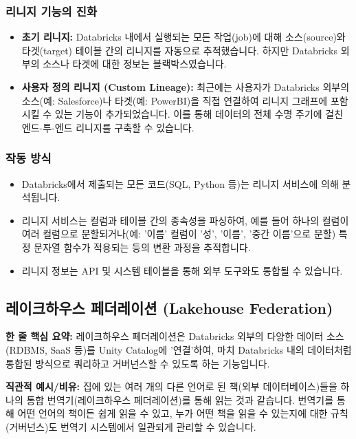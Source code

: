 \documentclass[11pt,a4paper]{article}
\begin{document}
\subsubsection*{리니지 기능의 진화}
\begin{itemize}
    \item \textbf{초기 리니지:} Databricks 내에서 실행되는 모든 작업(job)에 대해 소스(source)와 타겟(target) 테이블 간의 리니지를 자동으로 추적했습니다. 하지만 Databricks 외부의 소스나 타겟에 대한 정보는 블랙박스였습니다.
    \item \textbf{사용자 정의 리니지 (Custom Lineage):} 최근에는 사용자가 Databricks 외부의 소스(예: Salesforce)나 타겟(예: PowerBI)을 직접 연결하여 리니지 그래프에 포함시킬 수 있는 기능이 추가되었습니다. 이를 통해 데이터의 전체 수명 주기에 걸친 엔드-투-엔드 리니지를 구축할 수 있습니다.
\end{itemize}

\subsubsection*{작동 방식}
\begin{itemize}
    \item Databricks에서 제출되는 모든 코드(SQL, Python 등)는 리니지 서비스에 의해 분석됩니다.
    \item 리니지 서비스는 컬럼과 테이블 간의 종속성을 파싱하여, 예를 들어 하나의 컬럼이 여러 컬럼으로 분할되거나(예: '이름' 컬럼이 '성', '이름', '중간 이름'으로 분할) 특정 문자열 함수가 적용되는 등의 변환 과정을 추적합니다.
    \item 리니지 정보는 API 및 시스템 테이블을 통해 외부 도구와도 통합될 수 있습니다.
\end{itemize}

\newpage
\subsection*{레이크하우스 페더레이션 (Lakehouse Federation)}

\begin{keyconceptbox}
\textbf{한 줄 핵심 요약:} 레이크하우스 페더레이션은 Databricks 외부의 다양한 데이터 소스(RDBMS, SaaS 등)를 Unity Catalog에 '연결'하여, 마치 Databricks 내의 데이터처럼 통합된 방식으로 쿼리하고 거버넌스할 수 있도록 하는 기능입니다.
\end{keyconceptbox}

\textbf{직관적 예시/비유:}
집에 있는 여러 개의 다른 언어로 된 책(외부 데이터베이스)들을 하나의 통합 번역기(레이크하우스 페더레이션)를 통해 읽는 것과 같습니다. 번역기를 통해 어떤 언어의 책이든 쉽게 읽을 수 있고, 누가 어떤 책을 읽을 수 있는지에 대한 규칙(거버넌스)도 번역기 시스템에서 일관되게 관리할 수 있습니다.
\end{document}
